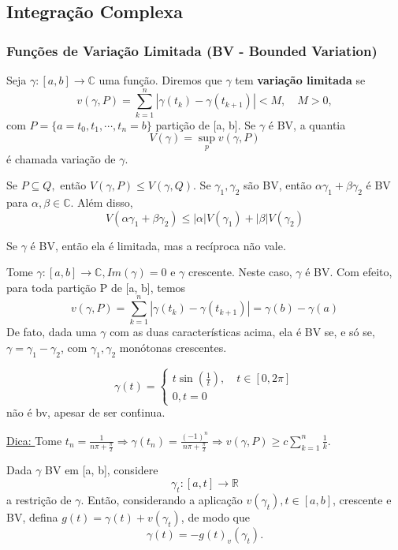 \documentclass[complex.tex]{subfiles}
\begin{document}
\subsection{Integração Complexa}
\subsubsection{Funções de Variação Limitada (BV - Bounded Variation)}
\begin{def*}
	Seja $\gamma:[a, b]\rightarrow \mathbb{C}$ uma função. Diremos que $\gamma$ tem \textbf{variação limitada} se
	$$
		v(\gamma, P) = \sum\limits_{k=1}^{n}|\gamma(t_{k}) - \gamma(t_{k+1})| < M, \quad M > 0,
	$$
	com $P = \{a=t_{0}, t_1, \cdots, t_n = b\} $ partição de [a, b]. Se $\gamma$ é BV, a quantia
	$$
		V(\gamma) = \sup_p v(\gamma, P)
	$$
	é chamada variação de $\gamma$.
\end{def*}
\begin{exer*}
	Se $P\subseteq{Q}, $ então $V(\gamma, P)\leq{V(\gamma, Q)}$. Se $\gamma_1, \gamma_2$ são BV, então $\alpha \gamma_1 + \beta \gamma_2$
	é BV para $\alpha, \beta\in \mathbb{C}.$ Além disso,
	$$
		V(\alpha \gamma_1 + \beta \gamma_2) \leq |\alpha|V(\gamma_1) + |\beta|V(\gamma_2)
	$$
\end{exer*}
\begin{exer*}
	Se $\gamma$ é BV, então ela é limitada, mas a recíproca não vale.
\end{exer*}
\begin{example}
	Tome $\gamma:[a, b]\rightarrow \mathbb{C}, Im(\gamma) = 0$ e $\gamma$ crescente. Neste caso, $\gamma$ é BV. Com efeito, para
	toda partição P de [a, b], temos
	$$
		v(\gamma, P) = \sum\limits_{k=1}^{n}|\gamma(t_{k}) - \gamma(t_{k+1})| = \gamma(b) - \gamma(a)
	$$
	De fato, dada uma $\gamma$ com as duas características acima, ela é BV se, e só se, $\gamma = \gamma_1 - \gamma_2$, com
	$\gamma_1, \gamma_2$ monótonas crescentes.
	\begin{exer*}
		$$
			\gamma(t) = \left\{\begin{array}{ll}
				t\sin{(\frac{1}{t})}, \quad t\in[0, 2\pi] \\
				0, t= 0
			\end{array}\right.
		$$
		não é bv, apesar de ser con\'tinua.

		\underline{Dica: } Tome $t_{n} =\displaystyle \frac{1}{n\pi + \frac{\pi}{2}}\Rightarrow \gamma(t_{n}) =\displaystyle \frac{(-1)^n}{n\pi + \frac{\pi}{2}}\Rightarrow
			v(\gamma, P) \geq c \sum\limits_{k=1}^{n}\frac{1}{k}.$
	\end{exer*}
\end{example}
Dada $\gamma$ BV em [a, b], considere
$$
	\gamma_t:[a, t]\rightarrow \mathbb{R}
$$
a restrição de $\gamma.$ Então, considerando a aplicação $v(\gamma_t), t\in[a, b]$, crescente e BV, defina $
	g(t) = \gamma(t) + v(\gamma_t)$, de modo que
$$
	\gamma(t) = -g(t) _ v(\gamma_t).
$$
\end{document}
